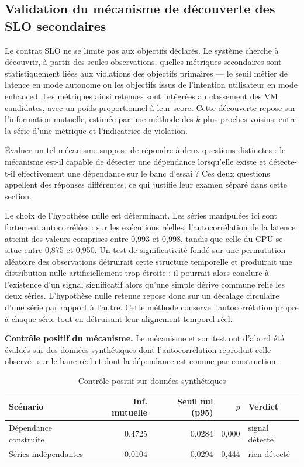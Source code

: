 \subsection{Validation du mécanisme de découverte des SLO secondaires}
\label{sec:validation-mi}

Le contrat SLO ne se limite pas aux objectifs déclarés. Le système cherche à découvrir, à partir des seules observations, quelles métriques secondaires sont statistiquement liées aux violations des objectifs primaires — le seuil métier de latence en mode autonome ou les objectifs issus de l'intention utilisateur en mode enhanced. Les métriques ainsi retenues sont intégrées au classement des VM candidates, avec un poids proportionnel à leur score. Cette découverte repose sur l'information mutuelle, estimée par une méthode des $k$ plus proches voisins, entre la série d'une métrique et l'indicatrice de violation.

Évaluer un tel mécanisme suppose de répondre à deux questions distinctes : le mécanisme est-il capable de détecter une dépendance lorsqu'elle existe et détecte-t-il effectivement une dépendance sur le banc d'essai ? Ces deux questions appellent des réponses différentes, ce qui justifie leur examen séparé dans cette section.

Le choix de l'hypothèse nulle est déterminant. Les séries manipulées ici sont fortement autocorrélées : sur les exécutions réelles, l'autocorrélation de la latence atteint des valeurs comprises entre 0,993 et 0,998, tandis que celle du CPU se situe entre 0,875 et 0,950. Un test de significativité fondé sur une permutation aléatoire des observations détruirait cette structure temporelle et produirait une distribution nulle artificiellement trop étroite : il pourrait alors conclure à l'existence d'un signal significatif alors qu'une simple dérive commune relie les deux séries. L'hypothèse nulle retenue repose donc sur un décalage circulaire d'une série par rapport à l'autre. Cette méthode conserve l'autocorrélation propre à chaque série tout en détruisant leur alignement temporel réel.

\textbf{Contrôle positif du mécanisme.} Le mécanisme et son test ont d'abord été évalués sur des données synthétiques dont l'autocorrélation reproduit celle observée sur le banc réel et dont la dépendance est connue par construction.

\begin{table}[H]
    \centering
    \caption{Contrôle positif sur données synthétiques}
    \label{tab:controle-positif-mi}
    \begin{tabular}{lrrrl}
        \toprule
        \textbf{Scénario} & \textbf{Inf. mutuelle} & \textbf{Seuil nul (p95)} & \textbf{$p$} & \textbf{Verdict} \\
        \midrule
        Dépendance construite & 0,4725 & 0,0284 & 0,000 & signal détecté \\
        Séries indépendantes  & 0,0104 & 0,0294 & 0,444 & rien détecté \\
        \bottomrule
    \end{tabular}
\end{table}

